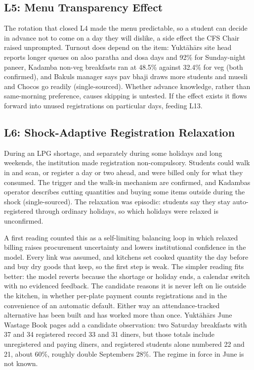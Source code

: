 \documentclass[
  10pt,
  table]{article}
\begin{document}
\subsection{L5: Menu Transparency Effect}\label{l5-menu-transparency-effect}

The rotation that closed L4 made the menu predictable, so a student can decide in advance not to come on a day they will dislike, a side effect the CFS Chair raised unprompted. Turnout does depend on the item: Yuktāhār\textquotesingle s site head reports longer queues on aloo paratha and dosa days and 92\% for Sunday-night paneer, Kadamba non-veg breakfasts ran at 48.5\% against 32.4\% for veg (both confirmed), and Bakul\textquotesingle s manager says pav bhaji draws more students and muesli and Chocos go readily (single-sourced). Whether advance knowledge, rather than same-morning preference, causes skipping is untested. If the effect exists it flows forward into unused registrations on particular days, feeding L13.

\subsection{L6: Shock-Adaptive Registration Relaxation}\label{l6-shock-adaptive-registration-relaxation}

During an LPG shortage, and separately during some holidays and long weekends, the institution made registration non-compulsory. Students could walk in and scan, or register a day or two ahead, and were billed only for what they consumed. The trigger and the walk-in mechanism are confirmed, and Kadamba\textquotesingle s operator describes cutting quantities and buying some items outside during the shock (single-sourced). The relaxation was episodic: students say they stay auto-registered through ordinary holidays, so which holidays were relaxed is unconfirmed.

A first reading counted this as a self-limiting balancing loop in which relaxed billing raises procurement uncertainty and lowers institutional confidence in the model. Every link was assumed, and kitchens set cooked quantity the day before and buy dry goods that keep, so the first step is weak. The simpler reading fits better: the model reverts because the shortage or holiday ends, a calendar switch with no evidenced feedback. The candidate reasons it is never left on lie outside the kitchen, in whether per-plate payment counts registrations and in the convenience of an automatic default. Either way an attendance-tracked alternative has been built and has worked more than once. Yuktāhār\textquotesingle s June Wastage Book pages add a candidate observation: two Saturday breakfasts with 37 and 34 registered record 33 and 31 diners, but those totals include unregistered and paying diners, and registered students alone numbered 22 and 21, about 60\%, roughly double September\textquotesingle s 28\%. The regime in force in June is not known.
\end{document}
